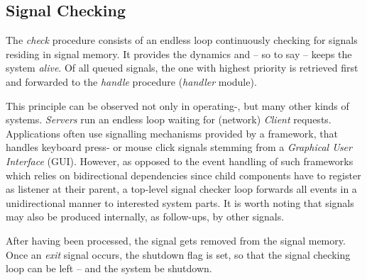 %
%
%
%
%
%
%

\subsection{Signal Checking}
\label{signal_checking_heading}

The \emph{check} procedure consists of an endless loop continuously checking
for signals residing in signal memory. It provides the dynamics and -- so to
say -- keeps the system \emph{alive}. Of all queued signals, the one with
highest priority is retrieved first and forwarded to the \emph{handle}
procedure (\emph{handler} module).

This principle can be observed not only in operating-, but many other kinds of
systems. \emph{Servers} run an endless loop waiting for (network) \emph{Client}
requests. Applications often use signalling mechanisms provided by a framework,
that handles keyboard press- or mouse click signals stemming from a
\emph{Graphical User Interface} (GUI). However, as opposed to the event
handling of such frameworks which relies on bidirectional dependencies since
child components have to register as listener at their parent, a top-level
signal checker loop forwards all events in a unidirectional manner to
interested system parts. It is worth noting that signals may also be produced
internally, as follow-ups, by other signals.

After having been processed, the signal gets removed from the signal memory.
Once an \emph{exit} signal occurs, the shutdown flag is set, so that the signal
checking loop can be left -- and the system be shutdown.
